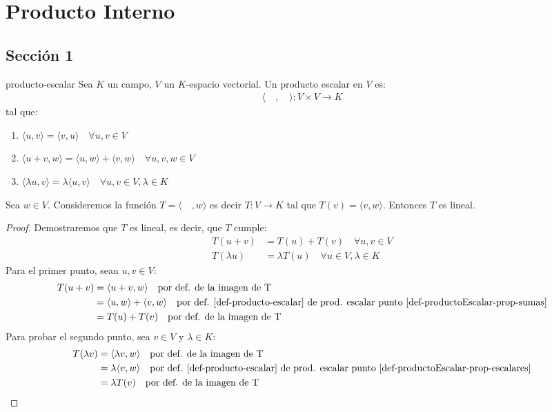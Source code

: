\chapter{Producto Interno}
\section{Sección 1}
\begin{definition}{producto-escalar}{}
    Sea $K$ un campo, $V$ un $K$-espacio vectorial. Un producto escalar en $V$ es:
    \begin{align*}
        \langle \quad , \quad \rangle : V \times V \rightarrow K 
    \end{align*}
    tal que:
    \begin{enumerate}
        \item $\langle u,v \rangle = \langle v,u \rangle \quad \forall u,v \in V$ \label{def-productoEscalar-prop-conmutatividad}
        \item $\langle u+v,w \rangle = \langle u,w \rangle + \langle v,w \rangle \quad \forall u,v,w \in V$ \label{def-productoEscalar-prop-sumas}
        \item $\langle \lambda u,v \rangle = \lambda \langle u,v \rangle \quad \forall u,v \in V, \lambda \in K$ \label{def-productoEscalar-prop-escalares}
    \end{enumerate}
\end{definition}


\begin{obs}{}{}
    Sea $w \in V$. Consideremos la función $T= \langle \quad , w\rangle$ es decir $T : V \rightarrow K$ tal que $T(v) = \langle v,w \rangle$. Entonces $T$ es lineal.
\end{obs}
\begin{proof}
    Demostraremos que $T$ es lineal, es decir, que $T$ cumple:
    \begin{align*}
        T(u+v) &= T(u) + T(v) \quad \forall u,v \in V \\
        T(\lambda u) &= \lambda T(u) \quad \forall u \in V, \lambda \in K
    \end{align*}
    Para el primer punto, sean $u,v \in V$:
    \begin{align*}
        T(u+v) &= \langle u+v, w \rangle \quad \text{por def. de la imagen de T} \\
        &= \langle u,w \rangle + \langle v,w \rangle \quad \text{por def. \ref{def-producto-escalar} de prod. escalar punto \ref{def-productoEscalar-prop-sumas}} \\
        &= T(u) + T(v) \quad \text{por def. de la imagen de T}
    \end{align*} 
    Para probar el segundo punto, sea $v \in V$ y $\lambda \in K$:
    \begin{align*}
        T(\lambda v) &= \langle \lambda v, w \rangle \quad \text{por def. de la imagen de T} \\
        &= \lambda \langle v,w \rangle \quad \text{por def. \ref{def-producto-escalar} de prod. escalar punto \ref{def-productoEscalar-prop-escalares}} \\
        &= \lambda T(v) \quad \text{por def. de la imagen de T}
    \end{align*}
\end{proof}



